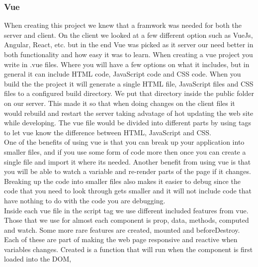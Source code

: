 \subsubsection{Vue}
When creating this project we knew that a framwork was needed for both the server and client. On the client we looked at a few different option such as VueJs, Angular, React, etc. but in the end Vue was picked as it server our need better in both functionality and how easy it was to learn. When creating a vue project you write in .vue files. Where you will have a few options on what it includes, but in general it can include HTML code, JavaScript code and CSS code. When you build the the project it will generate a single HTML file, JavaScript files and CSS files to a configured build directory. We put that directory inside the public folder on our server. This made it so that when doing changes on the client files it would rebuild and restart the server taking advatage of hot updating the web site while developing. The vue file would be divided into different parts by using tags to let vue know the difference between HTML, JavaScript and CSS.
\\[11pt]
One of the benefits of using vue is that you can break up your application into smaller files, and if you use some form of code more then once you can create a single file and import it where its needed. Another benefit from using vue is that you will be able to watch a variable and re-render parts of the page if it changes. Breaking up the code into smaller files also makes it easier to debug since the code that you need to look through gets smaller and it will not include code that have nothing to do with the code you are debugging.
\\[11pt]
Inside each vue file in the script tag we use different included features from vue. Those that we use for almost each component is prop, data, methods, computed and watch. Some more rare features are created, mounted and beforeDestroy. Each of these are part of making the web page responsive and reactive when variables changes. Created is a function that will run when the component is first loaded into the DOM, 